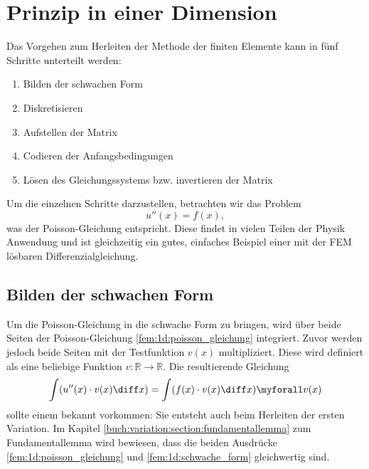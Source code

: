 %
%
%
%
\section{Prinzip in einer Dimension\label{fem:prinzip_1d}}

Das Vorgehen zum Herleiten der Methode der finiten Elemente kann in fünf Schritte unterteilt werden:
\begin{enumerate}
    \item Bilden der schwachen Form
    \item Diskretisieren
    \item Aufstellen der Matrix
    \item Codieren der Anfangsbedingungen
    \item Lösen des Gleichungssystems bzw. invertieren der Matrix
\end{enumerate}

Um die einzelnen Schritte darzustellen, betrachten wir das Problem
\begin{equation}
    u''(x) = f(x)
    \label{fem:1d:poisson_gleichung},
\end{equation}
was der Poisson-Gleichung entspricht. 
Diese findet in vielen Teilen der Physik Anwendung und ist gleichzeitig ein gutes, einfaches Beispiel einer mit der FEM lösbaren Differenzialgleichung.


\subsection{Bilden der schwachen Form}
Um die Poisson-Gleichung in die schwache Form zu bringen, wird über beide Seiten der Poisson-Gleichung \ref{fem:1d:poisson_gleichung} integriert.
Zuvor werden jedoch beide Seiten mit der Testfunktion $ v(x) $ multipliziert. %
Diese wird definiert als eine beliebige Funktion $ v \colon \mathbb{R} \rightarrow \mathbb{R} $.
Die resultierende Gleichung
\begin{equation}
    \int(u''(x) \cdot v(x) \diff x) = \int(f(x) \cdot v(x) \diff x) \myforall v(x)
    \label{fem:1d:schwache_form}
\end{equation}
sollte einem bekannt vorkommen: Sie entsteht auch beim Herleiten der ersten Variation.
Im Kapitel \ref{buch:variation:section:fundamentallemma} zum Fundamentallemma wird bewiesen, dass die beiden Ausdrücke \ref{fem:1d:poisson_gleichung} und \ref{fem:1d:schwache_form} gleichwertig sind.

